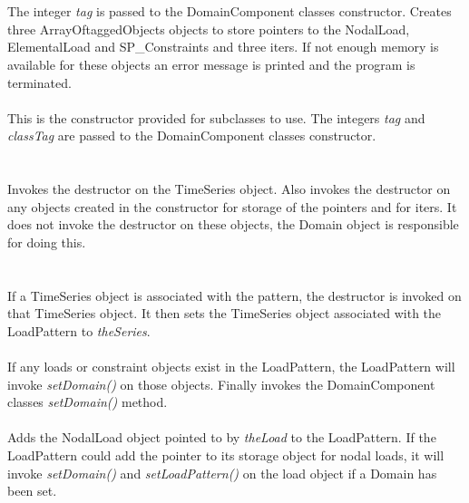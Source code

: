  \\ 
\\ 
The integer {\em tag} is passed to the DomainComponent classes
constructor. Creates three ArrayOftaggedObjects objects to store
pointers to the NodalLoad, ElementalLoad and SP\_Constraints and three
iters. If not enough memory is available for these objects an error
message is printed and the program is terminated. \\  

\\ 
This is the constructor provided for subclasses to use. The integers
{\em tag} and {\em classTag} are passed to the DomainComponent classes
constructor. \\ 

 \\
\\ 
Invokes the destructor on the TimeSeries object. Also invokes the
destructor on any objects created in the constructor for storage of
the pointers and for iters. It does not invoke the destructor on these
objects, the Domain object is responsible for doing this.\\

 \\
\\
If a TimeSeries object is associated with the pattern, the destructor
is invoked on that TimeSeries object. It then sets the TimeSeries object
associated with the LoadPattern to {\em theSeries}. \\

\\ 
If any loads or constraint objects exist in the LoadPattern, the
LoadPattern will invoke {\em setDomain()} on those objects. Finally
invokes the DomainComponent classes {\em setDomain()} method. \\

\\
Adds the NodalLoad object pointed to by {\em theLoad} to the
LoadPattern. If the LoadPattern could add the pointer to its storage
object for nodal loads, it will invoke {\em setDomain()}
and {\em setLoadPattern()} on the load object if a Domain has been set. \\

